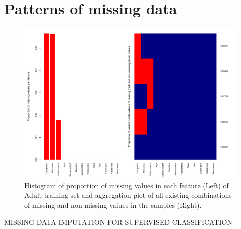 \documentclass[10pt]{book}
\theoremstyle{definition}
\begin{document}
\section{Patterns of missing data}

\newpage
\lhead[\footnotesize\thepage\fancyplain{}\leftmark]{}\rhead[]{\fancyplain{}\rightmark\footnotesize\thepage}%

\begin{figure}[h!]
\includegraphics [scale=0.45]{figure/proportion-missing-adult.pdf}\par
\caption{\footnotesize Histogram of proportion of missing values in each feature (Left) of Adult training set and aggregation plot of all existing combinations of missing and non-missing values in the samples (Right).}
 \label{fig:proportion-missing-adult}
\end{figure}

\clearpage
{}
{\hfill {\footnotesize\rm MISSING DATA IMPUTATION FOR SUPERVISED CLASSIFICATION} \hfill}
\end{document}
